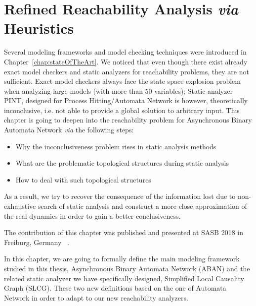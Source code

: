 \chapter{Refined Reachability Analysis \textit{via} Heuristics}\label{chap:refinement}
\begin{mybox}
Several modeling frameworks and model checking techniques were %
introduced in Chapter~\ref{chap:stateOfTheArt}.
We noticed that even though there exist already exact model checkers and static analyzers for reachability problems, they are not sufficient.
Exact model checkers always face %
the state space explosion problem when analyzing large models (with more than %
50 variables);
Static analyzer PINT, designed for Process Hitting/Automata Network is however, theoretically inconclusive, i.e. not able to provide a global solution to arbitrary input.
This chapter is going to deepen into the reachability problem for Asynchronous Binary Automata Network %
\textit{via} the following steps:

\begin{itemize}
    \item Why the inconclusiveness problem rises in static analysis methods%
    \item What are the problematic topological structures during static analysis %
    \item How to deal with such topological structures
\end{itemize}

As a result, we try to recover the consequence of the information lost due to non-exhaustive search of static analysis and construct a more close approximation of the real dynamics in order to gain a better conclusiveness.

The contribution of this chapter was published and presented at SASB 2018 in Freiburg, Germany ~\cite{chai2018reach}.
\end{mybox}

In this chapter, we are going to formally define the main modeling framework studied in this thesis, Asynchronous Binary Automata Network (ABAN) and the %
related static analyzer we have specifically designed, 
Simplified Local Causality Graph (SLCG).
These two new definitions based on the one of Automata Network in order to adapt to our new reachability analyzers.

